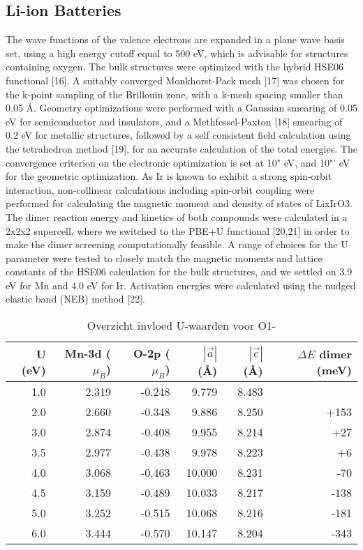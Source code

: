 \begin{refsection}
\subsection{Li-ion Batteries}

The wave functions of the valence electrons are expanded in a plane wave basis set, using a high energy cutoff equal to 500 eV, which is advisable for structures containing oxygen. The bulk structures were optimized with the hybrid HSE06 functional [16]. A suitably converged Monkhorst-Pack mesh [17] was chosen for the k-point sampling of the Brillouin zone, with a k-mesh spacing smaller than 0.05 \AA. Geometry optimizations were performed with a Gaussian smearing of 0.05 eV for semiconductor and insulators, and a Methfessel-Paxton [18] smearing of 0.2 eV for metallic structures, followed by a self consistent field calculation using the tetrahedron method [19], for an accurate calculation of the total energies. The convergence criterion on the electronic optimization is set at 10" eV, and 10"' eV for the geometric optimization. As Ir is known to exhibit a strong spin-orbit interaction, non-collinear calculations including spin-orbit coupling were performed for calculating the magnetic moment and density of states of LixIrO3. The dimer reaction energy and kinetics of both compounds were calculated in a 2x2x2 supercell, where we switched to the PBE+U functional [20,21] in order to make the dimer screening computationally feasible. A range of choices for the U parameter were tested to closely match the magnetic moments and lattice constants of the HSE06 calculation for the bulk structures, and we settled on 3.9 eV for Mn and 4.0 eV for Ir. Activation energies were calculated using the nudged elastic band (NEB) method [22]. 

\begin{table}[h]
\centering
\caption{Overzicht invloed U-waarden voor O1-}
  \begin{tabular}{rrrrrr}
    \toprule
    U (eV) & Mn-3d ($\mu_B$) & O-2p ($\mu_B$) & $|\vec{a}|$ (\si{\angstrom}) & $|\vec{c}|$ (\si{\angstrom}) & $\Delta E$ dimer (meV) \\
    \midrule
    1.0 & 2.319 & -0.248 & 9.779 & 8.483 &  \\ 
    2.0 & 2.660 & -0.348 & 9.886 & 8.250 & +153 \\
    3.0 & 2.874 & -0.408 & 9.955 & 8.214 & +27 \\ 
    3.5 & 2.977 & -0.438 & 9.978 & 8.223 & +6 \\ 
    4.0 & 3.068 & -0.463 & 10.000 & 8.231 & -70 \\ 
    4.5 & 3.159 & -0.489 & 10.033 & 8.217 & -138 \\ 
    5.0 & 3.252 & -0.515 & 10.068 & 8.216 & -181 \\  
    6.0 & 3.444 & -0.570 & 10.147 & 8.204 & -343 \\ 
   \bottomrule
   \end{tabular}
\end{table}


\end{refsection}
